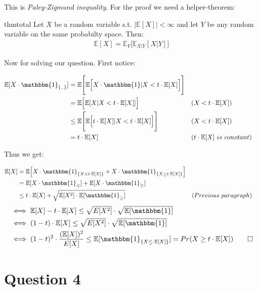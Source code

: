 \documentclass[a4paper]{article}
\newcommand{\lc}{\left\{}
\newcommand{\rc}{\right\}}
\newcommand{\E}{\mathbb{E}}
\newcommand{\I}{\mathbbm{1}}
\newcommand{\qedsquare}{\tag*{$\square$}}
\begin{document}
This is \textit{Paley-Zigmund inequality}. For the proof we need a helper-theorem:

\begin{restatable}{thm}{total}
    \label{thm:total}
    Let $X$ be a random variable s.t. $|\E[X]|<\infty$ and let $Y$ be any random variable on the same probabilty space.
    Then:
    \begin{align*}
        \E[X] = \E_Y \Big[ \E_{X|Y} [X|Y] \Big]
    \end{align*}
\end{restatable}

Now for solving our question. First notice:

\begin{align*}
    \E[X \cdot \I_{\lc..\rc}] &= \E \Bigg[ \E \Big[ X \cdot \I | X < t \cdot \E[X] \Big] \Bigg] \\
    &= \E \Big[ \E [ X | X < t \cdot \E[X] ] \Big] && (X<t \cdot \E[X]) \\
    &\leq \E \Bigg[ \E \Big[ t\cdot\E[X] | X < t \cdot \E[X] \Big] \Bigg] && (X<t\cdot\E[X]) \\
    &= t\cdot\E[X] && (t\cdot\E[X]\ is\ constant)
\end{align*}

Thus we get:

\begin{align*}
    \E[X] &= \E \Big[ X \cdot \I_{\lc X < t \cdot \E[X] \rc} + X \cdot \I_{ \lc X \geq t \cdot \E[X] \rc } \Big] \\
    &= \E[X\cdot\I_{<}] + \E[X\cdot\I_{\geq}] \\
    &\leq t\cdot\E[X] + \sqrt{ \E[X^2] \cdot \E[\I_{\geq}] } && (Previous\ paragraph) \\
\end{align*}
\begin{align*}
    &\iff \E[X] - t\cdot\E[X] \leq \sqrt{E[X^2]} \cdot \sqrt{\E[\I]} \\
    &\iff (1-t) \cdot \E[X] \leq \sqrt{E[X^2]} \cdot \sqrt{\E[\I]}  \\
    &\iff (1-t)^2 \cdot \frac{(\E[X])^2}{E[X]} \leq \E[ \I_{ \lc X \leq \cdot \E[X] \rc} ]
    = Pr( X \geq t \cdot \E[X] )
    \qedsquare
\end{align*}

\newpage

\section {Question 4}
\end{document}
